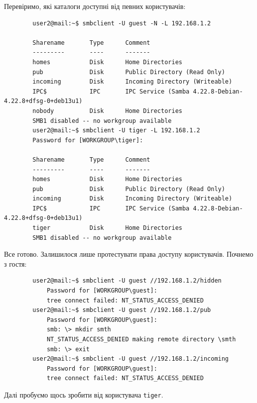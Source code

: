 \documentclass[14pt, a4paper]{extreport}
\begin{document}
	Перевіримо, які каталоги доступні від певних користувачів: \sideat{[VM 2]}
	
	\begin{verbatim}
		user2@mail:~$ smbclient -U guest -N -L 192.168.1.2
		
		Sharename       Type      Comment
		---------       ----      -------
		homes           Disk      Home Directories
		pub             Disk      Public Directory (Read Only)
		incoming        Disk      Incoming Directory (Writeable)
		IPC$            IPC       IPC Service (Samba 4.22.8-Debian-4.22.8+dfsg-0+deb13u1)
		nobody          Disk      Home Directories
		SMB1 disabled -- no workgroup available
		user2@mail:~$ smbclient -U tiger -L 192.168.1.2
		Password for [WORKGROUP\tiger]:
		
		Sharename       Type      Comment
		---------       ----      -------
		homes           Disk      Home Directories
		pub             Disk      Public Directory (Read Only)
		incoming        Disk      Incoming Directory (Writeable)
		IPC$            IPC       IPC Service (Samba 4.22.8-Debian-4.22.8+dfsg-0+deb13u1)
		tiger           Disk      Home Directories
		SMB1 disabled -- no workgroup available
	\end{verbatim}
	
	Все готово. Залишилося лише протестувати права доступу користувачів. Почнемо з гостя: \sideat{[VM 2]}
	
	\begin{verbatim}
		user2@mail:~$ smbclient -U guest //192.168.1.2/hidden
			Password for [WORKGROUP\guest]:
			tree connect failed: NT_STATUS_ACCESS_DENIED
		user2@mail:~$ smbclient -U guest //192.168.1.2/pub
			Password for [WORKGROUP\guest]:
			smb: \> mkdir smth
			NT_STATUS_ACCESS_DENIED making remote directory \smth
			smb: \> exit
		user2@mail:~$ smbclient -U guest //192.168.1.2/incoming
			Password for [WORKGROUP\guest]:
			tree connect failed: NT_STATUS_ACCESS_DENIED
	\end{verbatim}
	
	Далі пробуємо щось зробити від користувача \texttt{tiger}. \sideat{[VM 2]}
	
\end{document}
